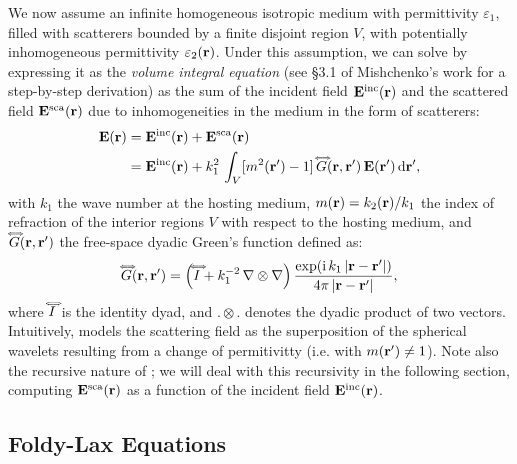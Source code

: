 We now assume an infinite homogeneous isotropic medium with permittivity $\varepsilon_1$, filled with scatterers bounded by a finite disjoint region $V$, with potentially inhomogeneous permittivity $\varepsilon_2(\mathbf{r})$. Under this assumption, we can solve  by expressing it as the \emph{volume integral equation} (see \S 3.1 of Mishchenko's work \cite{mishchenko2006multiple} for a step-by-step derivation) as the sum of the incident field $\mathbf{E}^\mathrm{inc}(\mathbf{r})$ and the scattered field $\mathbf{E}^\mathrm{sca}(\mathbf{r})$ due to inhomogeneities in the medium in the form of scatterers:
\begin{align}
    \mathbf{E}(\mathbf{r}) & = \mathbf{E}^\mathrm{inc}(\mathbf{r}) + \mathbf{E}^\mathrm{sca}(\mathbf{r}) \\
    & =\mathbf{E}^\mathrm{inc}(\mathbf{r}) + k_1^2\,\int_V [m^2(\mathbf{r}')-1] \,{\accentset{\Longleftrightarrow}{G}}(\mathbf{r},\mathbf{r}') \,\mathbf{E}(\mathbf{r}') \,\mathrm{d} \mathbf{r}',
    \label{eq:vri}
\end{align}
with $k_1$ the wave number at the hosting medium, $m(\mathbf{r}) = k_2(\mathbf{r})/k_1$ the index of refraction of the interior regions $V$ with respect to the hosting medium, and ${\accentset{\Longleftrightarrow}{G}}(\mathbf{r},\mathbf{r}')$ the free-space dyadic Green's function defined as:
\begin{equation}
    {\accentset{\Longleftrightarrow}{G}}(\mathbf{r},\mathbf{r}') = \left({\accentset{\Longleftrightarrow}{I}} + k_1^{-2}\,\nabla\otimes\nabla\right) \frac{\exp(\mathrm{i}\,k_1 \,|\mathbf{r}-\mathbf{r}'|)}{4\pi\,|\mathbf{r}-\mathbf{r}'|},
    \label{eq:greenfunc}
\end{equation}
where ${\accentset{\Longleftrightarrow}{I}}$ is the identity dyad, and $. \otimes .$ denotes the dyadic product of two vectors. Intuitively,  models the scattering field as the superposition of the spherical wavelets resulting from a change of permitivitty (i.e. with $m(\mathbf{r}')\neq1$). Note also the recursive nature of ; we will deal with this recursivity in the following section, computing $\mathbf{E}^\mathrm{sca}(\mathbf{r})$ as a function of the incident field $\mathbf{E}^\mathrm{inc}(\mathbf{r})$. 

\subsection{Foldy-Lax Equations}
\label{ssec:foldy-lax}

